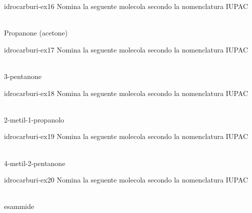 \documentclass[preview]{standalone}
\begin{document}
\begin{snippetexercise}{idrocarburi-ex16}
    {Nomina la seguente molecola secondo la nomenclatura IUPAC}
    \begin{center}
        \\\vspace{0.25cm}
        Propanone (acetone)
    \end{center}
\end{snippetexercise}

\begin{snippetexercise}{idrocarburi-ex17}
    {Nomina la seguente molecola secondo la nomenclatura IUPAC}
    \begin{center}
        \\\vspace{0.25cm}
        3-pentanone
    \end{center}
\end{snippetexercise}

\begin{snippetexercise}{idrocarburi-ex18}
    {Nomina la seguente molecola secondo la nomenclatura IUPAC}
    \begin{center}
        \\\vspace{0.25cm}
        2-metil-1-propanolo
    \end{center}
\end{snippetexercise}

\begin{snippetexercise}{idrocarburi-ex19}
    {Nomina la seguente molecola secondo la nomenclatura IUPAC}
    \begin{center}
        \\\vspace{0.25cm}
        4-metil-2-pentanone
    \end{center}
\end{snippetexercise}

\begin{snippetexercise}{idrocarburi-ex20}
    {Nomina la seguente molecola secondo la nomenclatura IUPAC}
    \begin{center}
        \\\vspace{0.25cm}
        esammide
    \end{center}
\end{snippetexercise}
\end{document}
